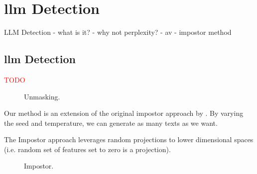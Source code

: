 \chapter{\acs{llm} Detection}
\label{chap:llm_detection}
    LLM Detection
    - what is it?
    - why not perplexity?
    - av
    - impostor method

\section{\acs{llm} Detection}
\label{sec:llm_detection}
\textcolor{red}{TODO}






\begin{figure}[htbp]
    \centering
    
    \caption{Unmasking.}
    \label{fig:unmasking}
\end{figure}
Our method is an extension of the original impostor approach by \citet{koppel_determining_2014}.
By varying the seed and temperature, we can generate as many texts as we want.
  
    
The Impostor approach leverages random projections to lower dimensional spaces (i.e. random set of features set to zero is a projection).
\begin{figure}[htbp]
    \centering
    
    \caption{Impostor.}
    \label{fig:impostor}
\end{figure}


